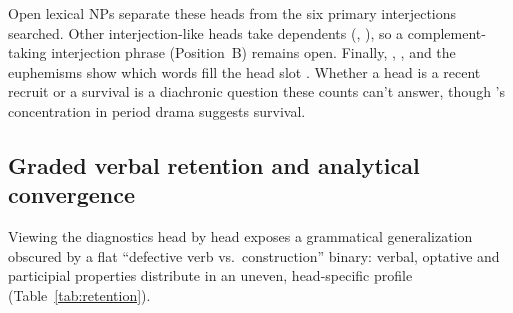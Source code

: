 \documentclass[12pt]{article}
\begin{document}
Open lexical NPs separate these heads from the six primary interjections searched. Other interjection-like heads take dependents (, ), so a complement-taking interjection phrase (Position~B) remains open. Finally, , ,  and the euphemisms show which words fill the head slot \citep{mcenery2006,napolihoeksema2009,ljung2011}. Whether a head is a recent recruit or a survival is a diachronic question these counts can't answer, though 's concentration in period drama suggests survival.

\subsection{Graded verbal retention and analytical convergence}
\label{sec:convergence}

Viewing the diagnostics head by head exposes a grammatical generalization obscured by a flat \enquote{defective verb vs.\ construction} binary: verbal, optative and participial properties distribute in an uneven, head-specific profile (Table~\ref{tab:retention}).
\end{document}
